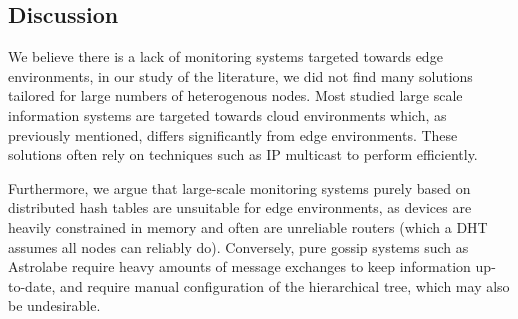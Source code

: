 \subsection{Discussion}

We believe there is a lack of monitoring systems targeted towards edge environments, in our study of the literature, we did not find many solutions tailored for large numbers of heterogenous nodes. Most studied large scale information systems are targeted towards cloud environments which, as previously mentioned, differs significantly from edge environments. These solutions often rely on techniques such as IP multicast \cite{massie2004ganglia} to perform efficiently.

Furthermore, we argue that large-scale monitoring systems purely based on distributed hash tables \cite{SDIMS} are unsuitable for edge environments, as  devices are heavily constrained in memory and often are unreliable routers (which a DHT assumes all nodes can reliably do). Conversely, pure gossip systems such as Astrolabe \cite{Renesse2003} require heavy amounts of message exchanges to keep information up-to-date, and require manual configuration of the hierarchical tree, which may also be undesirable. 





    
    
